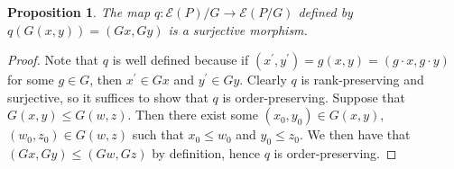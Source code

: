 \documentclass[10 pt]{amsart}
\theoremstyle{plain}
\newtheorem{prop}[thm]{Proposition}
\theoremstyle{definition}
\theoremstyle{remark}
\numberwithin{equation}{section}
\newcommand\rk{\operatorname{rk}}
\begin{document}
\begin{prop}\label{prop:surjection_between_F_quotients}
The map $q\colon \mathcal E(P)/G\rightarrow \mathcal E(P/G)$ defined by $q(G(x, y)) = (Gx,Gy)$ is a surjective morphism.
\end{prop}

\begin{proof}



Note that $q$ is well defined because if $(x^\prime, y^\prime) = g(x, y) = (g\cdot x, g\cdot y)$ for some $g\in G$, then $x^\prime\in Gx$ and $y^\prime\in Gy$.  Clearly $q$ is rank-preserving and surjective, so it suffices to show that $q$ is order-preserving.  Suppose that $G(x, y) \le G(w, z)$.  Then there exist some $(x_0, y_0)\in G(x, y)$, $(w_0, z_0)\in G(w, z)$ such that $x_0\le w_0$ and $y_0\le z_0$.  We then have that $(Gx, Gy) \le (Gw, Gz)$ by definition, hence $q$ is order-preserving.
\end{proof}
\end{document}
